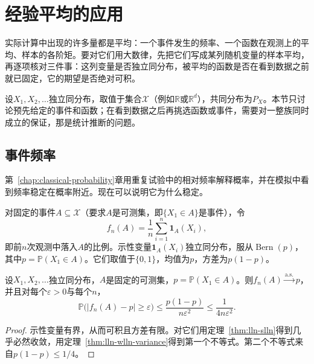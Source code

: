 \section{经验平均的应用}
\label{sec:lln-applications}

实际计算中出现的许多量都是平均：一个事件发生的频率、一个函数在观测上的平均、样本的各阶矩。要对它们用大数律，先把它们写成某列随机变量的样本平均，再逐项核对三件事：这列变量是否独立同分布，被平均的函数是否在看到数据之前就已固定，它的期望是否绝对可积。

设$X_1,X_2,\dots$独立同分布，取值于集合$\mathcal{X}$（例如$\mathbb{R}$或$\mathbb{R}^d$），共同分布为$P_X$。本节只讨论预先给定的事件和函数；在看到数据之后再挑选函数或事件，需要对一整族同时成立的保证，那是统计推断的问题。

\subsection{事件频率}
\label{sec:lln-frequency}

第~\ref{chap:classical-probability}章用重复试验中的相对频率解释概率，并在模拟中看到频率稳定在概率附近。现在可以说明它为什么稳定。

对固定的事件$A\subseteq\mathcal{X}$（要求$A$是可测集，即$\{X_1\in A\}$是事件），令
\begin{equation}
 f_n(A)=\frac{1}{n}\sum_{i=1}^{n}\mathbf{1}_{A}(X_i) ,
 \label{eq:lln-frequency}
\end{equation}
即前$n$次观测中落入$A$的比例。示性变量$\mathbf{1}_A(X_i)$独立同分布，服从$\operatorname{Bern}(p)$，其中$p=\mathbb{P}(X_1\in A)$。它们取值于$\{0,1\}$，均值为$p$，方差为$p(1-p)$。

\begin{theorem}[频率的大数律]
\label{thm:lln-frequency}
设$X_1,X_2,\dots$独立同分布，$A$是固定的可测集，$p=\mathbb{P}(X_1\in A)$。则$f_n(A)\xrightarrow{\mathrm{a.s.}}p$，并且对每个$\varepsilon>0$与每个$n$，
\begin{equation}
 \mathbb{P}\bigl(\lvert f_n(A)-p\rvert\geq\varepsilon\bigr)\leq\frac{p(1-p)}{n\varepsilon^2}\leq\frac{1}{4n\varepsilon^2} .
 \label{eq:lln-frequency-bound}
\end{equation}
\end{theorem}

\begin{proof}
示性变量有界，从而可积且方差有限。对它们用定理~\ref{thm:lln-slln}得到几乎必然收敛，用定理~\ref{thm:lln-wlln-variance}得到第一个不等式。第二个不等式来自$p(1-p)\leq1/4$。
\end{proof}

